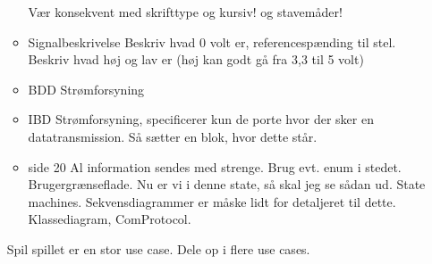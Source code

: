 \documentclass{article}
\begin{document}
\begin{itemize}
\begin{itemize}
			\subitem Vær konsekvent med skrifttype og kursiv! og stavemåder! 
			\item Signalbeskrivelse
			\subitem Beskriv hvad 0 volt er, referencespænding til stel. 
			\subitem Beskriv hvad høj og lav er (høj kan godt gå fra 3,3 til 5 volt)
			\item BDD
			\subitem Strømforsyning
			\item IBD 
			\subitem Strømforsyning, specificerer kun de porte hvor der sker en datatransmission. Så sætter en blok, hvor dette står. 
			\item side 20
			\subitem Al information sendes med strenge. Brug evt. enum i stedet.
			\subitem Brugergrænseflade. Nu er vi i denne state, så skal jeg se sådan ud. State machines. Sekvensdiagrammer er måske lidt for detaljeret til dette. 
			\subitem Klassediagram, ComProtocol. 
		\end{itemize}
		\subitem Spil spillet er en stor use case. Dele op i flere use cases. 
		\subitem 
	\end{itemize}
\end{document}
